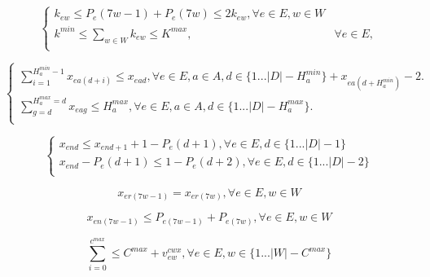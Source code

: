 \begin{equation}\label{trese}
 \left \{
\begin{matrix}

k_{ew} \leq P_e(7w-1) + P_e(7w) \leq 2k_{ew}, \forall e \in E, w \in W \\

k^{min} \leq \sum_{w \in W} k_{ew} \leq K^{max}, & \forall e \in E,\\

\end{matrix}
\right.
\end{equation}

\begin{equation}\label{tresf}
 \left \{
\begin{matrix}

\sum_{i=1}^{H_a^{min}-1} x_{ea(d+i)} \leq x_{ead}, \forall e \in E, a \in A, d \in \{ 1...|D|-H_a^{min} \} + x_{ea(d+H_a^{min})} - 2. \\

\sum_{g=d}^{H_a^{max}=d} x_{eag} \leq H_a^{max}, \forall e \in E, a \in A, d \in \{1...|D|-H_a^{max} \}. \\

\end{matrix}
\right.
\end{equation}

\begin{equation}\label{quatro}
 \left \{
\begin{matrix}

x_{end} \leq x_{end+1} + 1 - P_e(d+1), \forall e \in E, d \in \{ 1...|D|- 1 \} \\

x_{end} - P_e(d+1) \leq 1 - P_e(d+2), \forall e \in E, d \in \{ 1...|D|- 2 \} \\

\end{matrix}
\right.
\end{equation}

\begin{equation}\label{cinco}
x_{er(7w-1)} = x_{er(7w)}, \forall e \in E, w \in W
\end{equation}

\begin{equation}\label{seis}
x_{en(7w-1)} \leq P_{e(7w-1)} + P_{e(7w)}, \forall e \in E, w \in W
\end{equation}

\begin{equation}\label{sete}
\sum_{i=0}^{c^{max}} \leq C^{max} + v_{ew}^{cwx}, \forall e \in E, w \in \{1...|W| - C^{max}\}
\end{equation}

